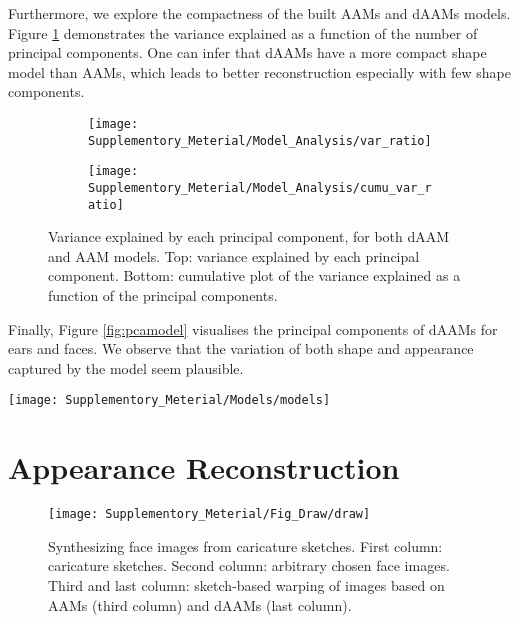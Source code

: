 Furthermore, we explore the compactness of the built AAMs and dAAMs models. 
Figure \ref{fig:compact} demonstrates the variance explained as a function of the number of principal components. One can infer that dAAMs have a more compact shape model than AAMs, which leads to better reconstruction especially with few shape components.

\begin{figure}[!t]
    \centering
    \begin{subfigure}[b]{0.43\textwidth}
            \texttt{[image: Supplementory\_Meterial/Model\_Analysis/var\_ratio]}
    \end{subfigure}
    \begin{subfigure}[b]{0.43\textwidth}
            \texttt{[image: Supplementory\_Meterial/Model\_Analysis/cumu\_var\_ratio]}
    \end{subfigure}
    \caption{Variance explained by each principal component, for both dAAM and AAM models. Top: variance explained by each principal component. Bottom: cumulative plot of the variance explained as a function of the principal components.}
    \label{fig:compact}
\end{figure}

Finally, Figure \ref{fig:pcamodel} visualises the principal components of dAAMs for ears and faces. We observe that the variation of both shape and appearance captured by the model seem plausible.

\begin{figure*}[!t]
\centering
\texttt{[image: Supplementory\_Meterial/Models/models]}
\caption{Principal components of dAAMs built on ears (top) and faces (bottom). The mean (middle columns) as well as the first five principal components are visualised for both shape (left) and appearance (right). $\pm 3$ times the variance of the corresponding component is used in each case.}
\label{fig:pcamodel}
\end{figure*}




\section{Appearance Reconstruction}
\label{sec:reconstruct}

\begin{figure}[!b]
    \centering
    \texttt{[image: Supplementory\_Meterial/Fig\_Draw/draw]}
    \caption{Synthesizing face images from caricature sketches. First column: caricature sketches. Second column: arbitrary chosen face images. Third and last column: sketch-based warping of images based on AAMs (third column) and dAAMs (last column).}
    \label{fig:draw}
\end{figure}

